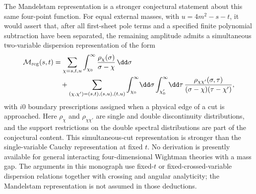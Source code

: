 The Mandelstam representation is a stronger conjectural statement about this
same four-point function.  For equal external masses, with
\(u=4m^2-s-t\), it would assert that, after all first-sheet pole terms and a
specified finite polynomial subtraction have been separated, the remaining
amplitude admits a simultaneous two-variable dispersion representation of the
form
\[
\begin{aligned}
  \mathcal M_{\rm reg}(s,t)
  &=
  \sum_{\chi=s,t,u}
  \int_{\chi_0}^{\infty}
  \frac{\rho_\chi(\sigma)}{\sigma-\chi}\,\dd\sigma
\\
  &\quad+
  \sum_{(\chi,\chi')=(s,t),(s,u),(t,u)}
  \int_{\chi_0}^{\infty}\!\dd\sigma
  \int_{\chi'_0}^{\infty}\!\dd\tau\,
  \frac{\rho_{\chi\chi'}(\sigma,\tau)}
  {(\sigma-\chi)(\tau-\chi')} ,
\end{aligned}
\]
with \(i0\) boundary prescriptions assigned when a physical edge of a cut is
approached.  Here \(\rho_\chi\) and \(\rho_{\chi\chi'}\) are single and double
discontinuity distributions, and the support restrictions on the double
spectral distributions are part of the conjectural content.  This
simultaneous-cut representation is stronger than the single-variable
Cauchy representation at fixed \(t\).  No derivation is presently available
for general interacting four-dimensional Wightman theories with a mass gap.
The arguments in this monograph use fixed-\(t\) or fixed-crossed-variable
dispersion relations together with crossing and angular analyticity; the
Mandelstam representation is not assumed in those deductions.

